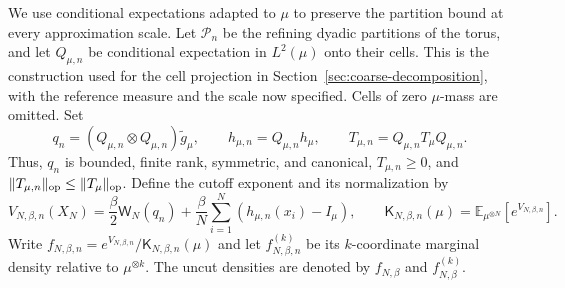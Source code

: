 \documentclass[11pt,reqno]{amsart}
\numberwithin{equation}{section}
\theoremstyle{plain}
\theoremstyle{definition}
\DeclarePairedDelimiter{\norm}{\lVert}{\rVert}
\newcommand{\E}{\mathbb E}
\newcommand{\op}{\mathrm{op}}
\newcommand{\be}{\beta}
\newcommand{\K}{\mathsf K}
\newcommand{\tl}{\widetilde}
\begin{document}
We use conditional expectations adapted to $\mu$ to preserve the partition bound at every approximation scale. Let $\mathscr P_n$ be the refining dyadic partitions of the torus, and let $Q_{\mu,n}$ be conditional expectation in $L^2(\mu)$ onto their cells. This is the construction used for the cell projection in Section~\ref{sec:coarse-decomposition}, with the reference measure and the scale now specified. Cells of zero $\mu$-mass are omitted. Set
\begin{equation}
 q_n=(Q_{\mu,n}\otimes Q_{\mu,n})\tl g_\mu,\qquad
 h_{\mu,n}=Q_{\mu,n}h_\mu,\qquad
 T_{\mu,n}=Q_{\mu,n}T_\mu Q_{\mu,n}.
 \label{eq:local-Markov-cutoff}
\end{equation}
Thus, $q_n$ is bounded, finite rank, symmetric, and canonical, $T_{\mu,n}\geq0$, and $\norm{T_{\mu,n}}_{\op}\leq\norm{T_\mu}_{\op}$. Define the cutoff exponent and its normalization by
\begin{equation}
 V_{N,\be,n}(X_N)
 =\frac{\be}{2}\mathsf W_N(q_n)
  +\frac{\be}{N}\sum_{i=1}^N(h_{\mu,n}(x_i)-I_\mu),
 \qquad
 \K_{N,\be,n}(\mu)=\E_{\mu^{\otimes N}}[e^{V_{N,\be,n}}].
 \label{eq:local-cutoff-exponent}
\end{equation}
Write $f_{N,\be,n}=e^{V_{N,\be,n}}/\K_{N,\be,n}(\mu)$ and let $f_{N,\be,n}^{(k)}$ be its $k$-coordinate marginal density relative to $\mu^{\otimes k}$. The uncut densities are denoted by $f_{N,\be}$ and $f_{N,\be}^{(k)}$.
\end{document}
